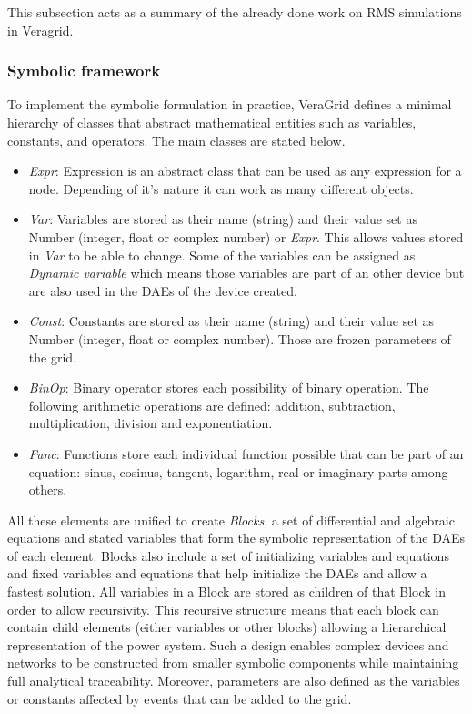 This subsection acts as a summary of the already done work on RMS simulations in Veragrid.

\subsubsection{Symbolic framework}
To implement the symbolic formulation in practice, VeraGrid defines a minimal hierarchy  of classes that abstract mathematical entities such as variables,
 constants, and operators. The main classes are stated below.

\begin{itemize}
  \item \textit{Expr}: Expression is an abstract class that can be used as any expression for a node. Depending of it's nature it can work as many different objects.
  \item \textit{Var}: Variables are stored as their name (string) and their value set as Number (integer, float or complex number) or \textit{Expr}. This allows values stored in
  \textit{Var} to be able to change. Some of the variables can be assigned as \textit{Dynamic variable} which means those variables are part of an other device but are also used in
  the DAEs of the device created.
  \item \textit{Const}: Constants are stored as their name (string) and their value set as Number (integer, float or complex number). Those are frozen parameters of the grid.
  \item \textit{BinOp}: Binary operator stores each possibility of binary operation. The following arithmetic operations are defined: addition, subtraction, multiplication, division and exponentiation.
  \item \textit{Func}: Functions store each individual function possible that can be part of an equation: sinus, cosinus, tangent, logarithm, real or imaginary parts among others.
\end{itemize}

All these elements are unified to create \textit{Blocks}, a set of differential and algebraic equations and stated variables that form the symbolic representation of the DAEs of each
element. Blocks also include a set of initializing variables and equations and fixed variables and equations that help initialize the DAEs and allow a fastest solution. All variables in a Block are stored as 
children of that Block in order to allow recursivity. This recursive structure means that each block can contain child elements (either variables or 
other blocks) allowing a hierarchical representation of the power system. Such a design enables complex devices and networks to be constructed from smaller symbolic components 
while maintaining full analytical traceability. Moreover, parameters are also defined as the variables or constants affected by events that can be added to the grid.

